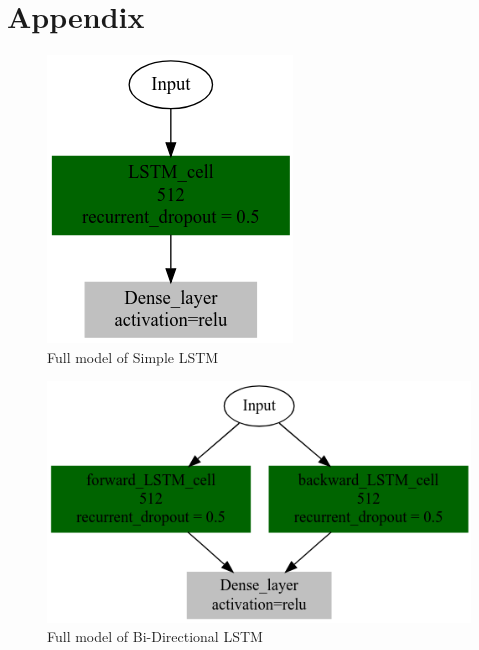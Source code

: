 \documentclass[conference]{IEEEtran}
\begin{document}
\section{Appendix}
\begin{figure}[H]
\begin{center}
\includegraphics[scale=0.5]{models/simple_LSTM.png}
\end{center}
\caption{Full model of Simple LSTM}
\end{figure}
\begin{figure}[H]
\begin{center}
\includegraphics[scale=0.5]{models/bidirectional_LSTM.png}
\end{center}
\caption{Full model of Bi-Directional LSTM}
\end{figure}
\end{document}
